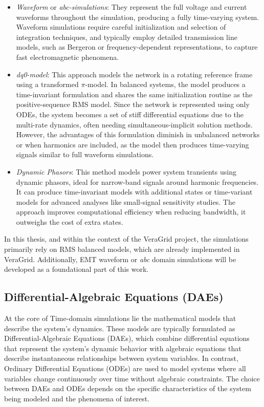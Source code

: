\begin{itemize}
    \item \textit{Waveform} or \textit{abc-simulations}: They represent the full voltage and current waveforms throughout the simulation, producing a fully time-varying system. 
Waveform simulations require careful initialization and selection of integration techniques, and typically employ detailed transmission line models, such as Bergeron or frequency-dependent
representations, to capture fast electromagnetic phenomena.
    \item \textit{dq0-model}: This approach models the network in a rotating reference frame using a transformed $\pi$-model. In balanced systems, the model produces a time-invariant 
    formulation and shares the same initialization routine as the positive-sequence RMS model. Since the network is represented using only ODEs, the system becomes a set of 
    stiff differential equations due to the multi-rate dynamics, often needing simultaneous-implicit solution methods. However, the advantages of this 
    formulation diminish in unbalanced networks or when harmonics are included, as the model then produces time-varying signals similar to full waveform simulations.
    \item \textit{Dynamic Phasors}: This method models power system transients using dynamic phasors, ideal for narrow-band signals around harmonic frequencies. 
    It can produce time-invariant models with additional states or time-variant models for advanced analyses like small-signal sensitivity studies. 
    The approach improves computational efficiency when reducing bandwidth, it outweighs the cost of extra states.
\end{itemize}

In this thesis, and within the context of the VeraGrid project, the simulations primarily rely on RMS balanced models, which are already implemented in VeraGrid. 
Additionally, EMT waveform  or \textit{abc} domain simulations will be developed as a foundational part of this work.


\subsection{Differential-Algebraic Equations (DAEs)}

At the core of Time-domain simulations lie the mathematical models that describe the system's dynamics. These models are typically formulated as Differential-Algebraic Equations
(DAEs), which combine differential equations that represent the system's dynamic behavior with algebraic equations that describe instantaneous relationships between system variables. 
In contrast, Ordinary Differential Equations (ODEs) are used to model systems where all variables change continuously over time without algebraic constraints. 
The choice between DAEs and ODEs depends on the specific characteristics of the system being modeled and the phenomena of interest.

